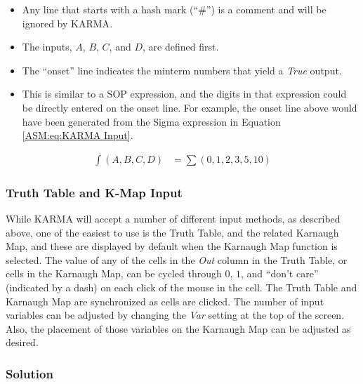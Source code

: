 \begin{itemize}
	\item Any line that starts with a hash mark (``\#'') is a comment and will be ignored by \ac{KARMA}. 
	\item The inputs, $ A $, $ B $, $ C $, and $ D $, are defined first. 
	\item The ``onset'' line indicates the minterm numbers that yield a \emph{True} output. 
	\item This is similar to a \ac{SOP} expression, and the digits in that expression could be directly entered on the onset line. For example, the onset line above would have been generated from the Sigma expression in Equation \ref{ASM:eq:KARMA Input}.
\end{itemize}

\begin{align}
	\label{ASM:eq:KARMA Input}
	\int(A,B,C,D) &= \sum(0,1,2,3,5,10)
\end{align}

\subsubsection{Truth Table and K-Map Input}
\label{ASM:subsubsec:karma_truth_table_and_kmap_input}

While \ac{KARMA} will accept a number of different input methods, as described above, one of the easiest to use is the Truth Table, and the related Karnaugh Map, and these are displayed by default when the Karnaugh Map function is selected. The value of any of the cells in the \emph{Out} column in the Truth Table, or cells in the Karnaugh Map, can be cycled through $ 0 $, $ 1 $, and ``don't care'' (indicated by a dash) on each click of the mouse in the cell. The Truth Table and Karnaugh Map are synchronized as cells are clicked. The number of input variables can be adjusted by changing the \emph{Var} setting at the top of the screen. Also, the placement of those variables on the Karnaugh Map can be adjusted as desired. 

\subsubsection{Solution}
\label{ASM:subsubsec:karma_truth_table_and_kmap_input}

